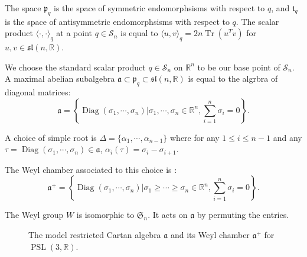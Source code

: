 \documentclass[reqno,10pt]{amsart}
\theoremstyle{plain}
\theoremstyle{definition}
\theoremstyle{remark}
\newcommand{\type}{\tau}
\newcommand{\R}{\mathbb{R}}
\newcommand{\Sph}{\mathbb{S}}
\newcommand{\transpose}[1]{\ensuremath{#1^{\scriptscriptstyle T}}}
\DeclareMathOperator{\tr}{Tr}
\DeclareMathOperator{\PSL}{PSL}
\DeclareMathOperator{\Diag}{Diag}
\begin{document}
The space $\mathfrak{p}_q$ is the space of symmetric endomorphsisms with respect to $q$, and $\mathfrak{t}_q$ is the space of antisymmetric endomorphsisms with respect to $q$. The scalar product $\langle \cdot,\cdot \rangle_q$ at a point $q\in \mathcal{S}_n$ is equal to $\langle u,v \rangle_q=2n\tr(\transpose{u}v)$ for $u,v\in \mathfrak{sl}(n,\R)$.

\smallskip

We choose the standard scalar product $q\in \mathcal{S}_n$ on $\R^n$ to be our base point of $\mathcal{S}_n$. A maximal abelian subalgebra $\mathfrak{a}\subset \mathfrak{p}_q\subset \mathfrak{sl}(n,\R)$ is equal to the algrbra of diagonal matrices:
$$\mathfrak{a}=\left\lbrace\Diag(\sigma_1,\cdots,\sigma_n)|\sigma_1,\cdots,\sigma_n\in \R^n, \sum_{i=1}^n\sigma_i=0\right\rbrace.$$

A choice of simple root is $\Delta=\lbrace\alpha_1,\cdots,\alpha_{n-1}\rbrace$ where for any $1\leq i\leq n-1$ and any $\type=\Diag(\sigma_1,\cdots,\sigma_n)\in \mathfrak{a}$, $\alpha_i(\type)=\sigma_i-\sigma_{i+1}$. 

\medskip

The Weyl chamber associated to this choice is :
$$\mathfrak{a}^+=\left\lbrace\Diag(\sigma_1,\cdots,\sigma_n)|\sigma_1\geq \cdots\geq \sigma_n\in \R^n, \sum_{i=1}^n\sigma_i=0\right\rbrace.$$

The Weyl group $W$ is isomorphic to $\mathfrak{S}_n$. It acts on $\mathfrak{a}$ by permuting the entries.

\medskip


\begin{figure}[h]
\begin{center}
\end{center}

\caption{The model restricted Cartan algebra $\mathfrak{a}$ and its Weyl chamber $\mathfrak{a}^+$ for $\PSL(3,\R)$.}
\label{fig:WeylSL3}
\end{figure}
\end{document}
